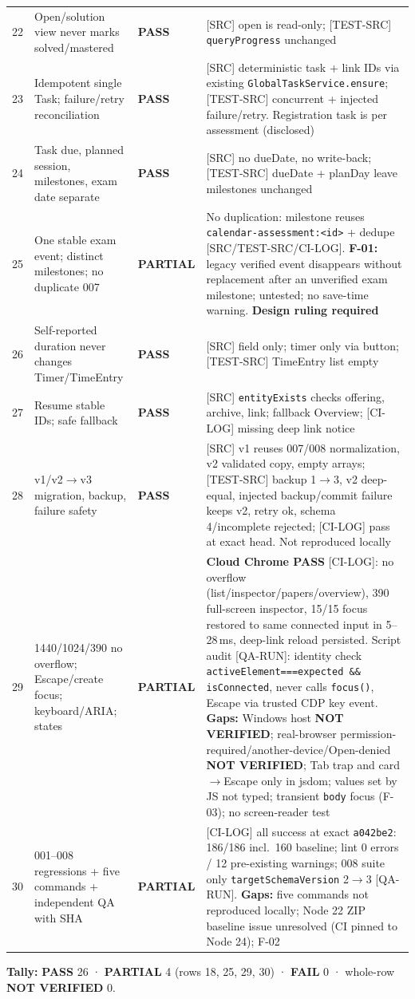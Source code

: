 \documentclass[11pt,a4paper]{article}
\newcommand{\sha}[1]{\texttt{\small #1}}
\newcommand{\PASS}{\textcolor{green!50!black}{\textbf{PASS}}}
\newcommand{\PART}{\textcolor{orange!80!black}{\textbf{PARTIAL}}}
\newcommand{\FAIL}{\textcolor{red!70!black}{\textbf{FAIL}}}
\newcommand{\NV}{\textcolor{gray!60!black}{\textbf{NOT VERIFIED}}}
\begin{document}
{\begin{longtable}{@{}p{0.5cm}p{4.3cm}p{1.6cm}p{9.3cm}@{}}
22 & Open/solution view never marks solved/mastered & \PASS & [SRC] open is read-only; [TEST-SRC] \texttt{queryProgress} unchanged \\
23 & Idempotent single Task; failure/retry reconciliation & \PASS & [SRC] deterministic task + link IDs via existing \texttt{GlobalTaskService.ensure}; [TEST-SRC] concurrent + injected failure/retry. Registration task is per assessment (disclosed) \\
24 & Task due, planned session, milestones, exam date separate & \PASS & [SRC] no dueDate, no write-back; [TEST-SRC] dueDate + planDay leave milestones unchanged \\
25 & One stable exam event; distinct milestones; no duplicate 007 & \PART & No duplication: milestone reuses \texttt{calendar-assessment:<id>} + dedupe [SRC/TEST-SRC/CI-LOG]. \textbf{F-01:} legacy verified event disappears without replacement after an unverified exam milestone; untested; no save-time warning. \textbf{Design ruling required} \\
26 & Self-reported duration never changes Timer/TimeEntry & \PASS & [SRC] field only; timer only via button; [TEST-SRC] TimeEntry list empty \\
27 & Resume stable IDs; safe fallback & \PASS & [SRC] \texttt{entityExists} checks offering, archive, link; fallback Overview; [CI-LOG] missing deep link notice \\
28 & v1/v2$\to$v3 migration, backup, failure safety & \PASS & [SRC] v1 reuses 007/008 normalization, v2 validated copy, empty arrays; [TEST-SRC] backup 1$\to$3, v2 deep-equal, injected backup/commit failure keeps v2, retry ok, schema 4/incomplete rejected; [CI-LOG] pass at exact head. Not reproduced locally \\
29 & 1440/1024/390 no overflow; Escape/create focus; keyboard/ARIA; states & \PART & \textbf{Cloud Chrome PASS} [CI-LOG]: no overflow (list/inspector/papers/overview), 390 full-screen inspector, 15/15 focus restored to same connected input in 5--28\,ms, deep-link reload persisted. Script audit [QA-RUN]: identity check \texttt{activeElement===expected \&\& isConnected}, never calls \texttt{focus()}, Escape via trusted CDP key event. \textbf{Gaps:} Windows host \NV; real-browser permission-required/another-device/Open-denied \NV; Tab trap and card$\to$Escape only in jsdom; values set by JS not typed; transient \texttt{body} focus (F-03); no screen-reader test \\
30 & 001--008 regressions + five commands + independent QA with SHA & \PART & [CI-LOG] all success at exact \sha{a042be2}: 186/186 incl.\ 160 baseline; lint 0 errors / 12 pre-existing warnings; 008 suite only \texttt{targetSchemaVersion} 2$\to$3 [QA-RUN]. \textbf{Gaps:} five commands not reproduced locally; Node 22 ZIP baseline issue unresolved (CI pinned to Node 24); F-02 \\
\bottomrule
\end{longtable}
}
\noindent\textbf{Tally:} \PASS{} 26 · \PART{} 4 (rows 18, 25, 29, 30) · \FAIL{} 0 · whole-row \NV{} 0.
\end{document}

